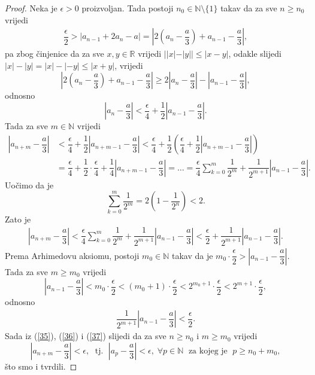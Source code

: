 \begin{proof}
Neka je \(\epsilon>0\) proizvoljan. Tada postoji \(n_0\in \mathbb{N}\setminus\{1\}\) takav da za sve \(n\geq n_0\) vrijedi
\begin{gather}
\label{35}
\dfrac{\epsilon}{2}>\left\lvert a_{n-1}+2a_n-a\right\rvert=\left\lvert 2\left(a_n-\dfrac{a}{3}\right)+a_{n-1}-\dfrac{a}{3}\right\rvert,
\end{gather}
pa zbog činjenice da za sve \(x, y\in \mathbb{R}\) vrijedi \(||x|-|y||\leq |x-y|\), odakle slijedi \(|x|-|y|=|x|-|-y|\leq |x+y|\), vrijedi
\[\left\lvert 2\left(a_n-\dfrac{a}{3}\right)+a_{n-1}-\dfrac{a}{3}\right\rvert\geq 2\left\lvert a_n-\dfrac{a}{3}\right\rvert-\left\lvert a_{n-1}-\dfrac{a}{3}\right\rvert,\]
odnosno
\[\left\lvert a_n-\dfrac{a}{3}\right\rvert<\dfrac{\epsilon}{4}+\dfrac{1}{2}\left\lvert a_{n-1}-\dfrac{a}{3}\right\rvert.\]
Tada za sve \(m\in \mathbb{N}\) vrijedi
\begin{align*}
\left\lvert a_{n+m}-\dfrac{a}{3}\right\rvert&<\dfrac{\epsilon}{4}+\dfrac{1}{2}\left\lvert a_{n+m-1}-\dfrac{a}{3}\right\rvert<\dfrac{\epsilon}{4}+\dfrac{1}{2}\left(\dfrac{\epsilon}{4}+\dfrac{1}{2}\left\lvert a_{n+m-1}-\dfrac{a}{3}\right\rvert\right)\\
&=\dfrac{\epsilon}{4}+\dfrac{1}{2}\cdot\dfrac{\epsilon}{4}+\dfrac{1}{4}\left\lvert a_{n+m-1}-\dfrac{a}{3}\right\rvert=\dots=\dfrac{\epsilon}{4}\sum_{k=0}^m{\dfrac{1}{2^m}}+\dfrac{1}{2^{m+1}}\left\lvert a_{n-1}-\dfrac{a}{3}\right\rvert.
\end{align*}
Uočimo da je \[\sum_{k=0}^m{\dfrac{1}{2^m}}=2\left(1-\dfrac{1}{2^n}\right)<2.\]
Zato je
\begin{gather}
\label{36}
\left\lvert a_{n+m}-\dfrac{a}{3}\right\rvert<\dfrac{\epsilon}{4}\sum_{k=0}^m{\dfrac{1}{2^m}}+\dfrac{1}{2^{m+1}}\left\lvert a_{n-1}-\dfrac{a}{3}\right\rvert<\dfrac{\epsilon}{2}+\dfrac{1}{2^{m+1}}\left\lvert a_{n-1}-\dfrac{a}{3}\right\rvert.
\end{gather}
Prema Arhimedovu aksiomu, postoji \(m_0\in \mathbb{N}\) takav da je \(m_0\cdot\dfrac{\epsilon}{2}>\left\lvert a_{n-1}-\dfrac{a}{3}\right\rvert\). Tada za sve \(m\geq m_0\) vrijedi
\[\left\lvert a_{n-1}-\dfrac{a}{3}\right\rvert<m_0\cdot\dfrac{\epsilon}{2}<(m_0+1)\cdot\dfrac{\epsilon}{2}<2^{m_0+1}\cdot\dfrac{\epsilon}{2}<2^{m+1}\cdot\dfrac{\epsilon}{2},\]
odnosno
\begin{gather}
\label{37}
\dfrac{1}{2^{m+1}}\left\lvert a_{n-1}-\dfrac{a}{3}\right\rvert<\dfrac{\epsilon}{2}.
\end{gather}
Sada iz (\ref{35}), (\ref{36}) i (\ref{37}) slijedi da za sve \(n\geq n_0\) i \(m\geq m_0\) vrijedi
\[\left\lvert a_{n+m}-\dfrac{a}{3}\right\rvert<\epsilon,\;\text{ tj. }\; \left\lvert a_{p}-\dfrac{a}{3}\right\rvert<\epsilon,\; \forall p\in \mathbb{N}\;\text{ za kojeg je }\; p\geq n_0+m_0,\]
što smo i tvrdili.
\end{proof}
